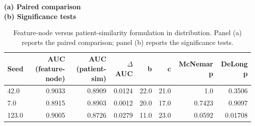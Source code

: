 \begin{table}[t]
\centering
\caption{Feature-node versus patient-similarity formulation in distribution. Panel (a) reports the paired comparison; panel (b) reports the significance tests.}
\label{tab:formulation}
\label{tab:formstats}
\footnotesize
\textbf{(a) Paired comparison}\\[2pt]
\vspace{7pt}
\textbf{(b) Significance tests}\\[2pt]
\begin{tabular}{lrrrrrrr}
\toprule
Seed & AUC (feature-node) & AUC (patient-sim) & $\Delta$AUC & b & c & McNemar p & DeLong p \\
\midrule
42.0 & 0.9033 & 0.8909 & 0.0124 & 22.0 & 21.0 & 1.0 & 0.3506 \\
7.0 & 0.8915 & 0.8903 & 0.0012 & 20.0 & 17.0 & 0.7423 & 0.9097 \\
123.0 & 0.9005 & 0.8726 & 0.0279 & 11.0 & 23.0 & 0.0592 & 0.01708 \\
\bottomrule
\end{tabular}
\end{table}
